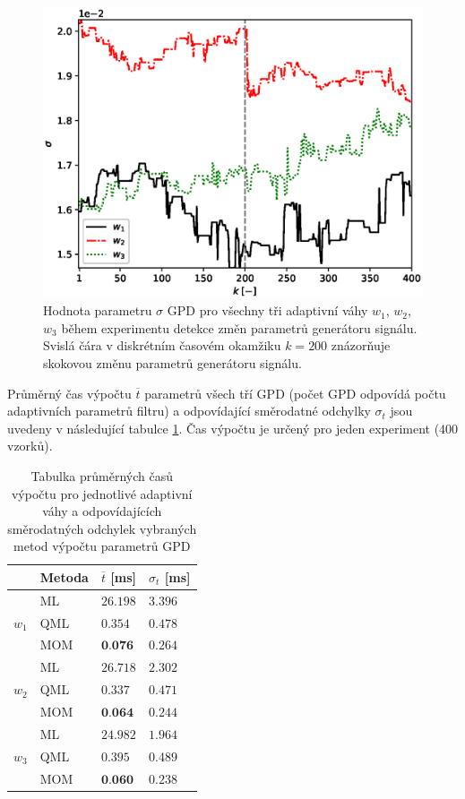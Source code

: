 \begin{figure}[h!]
	\label{fig:par_sigma}
	\centering
	\includegraphics[scale=0.71]{IMG/appel_par/par_sigma.eps}
	\caption{Hodnota parametru $\sigma$ GPD pro všechny tři adaptivní váhy $w_1$, $w_2$, $w_3$ během experimentu detekce změn parametrů generátoru signálu. Svislá čára v diskrétním časovém okamžiku $k=200$ znázorňuje skokovou změnu parametrů generátoru signálu.}
\end{figure}
Průměrný čas výpočtu $\overline{t}$ parametrů všech tří GPD (počet GPD odpovídá počtu adaptivních parametrů filtru) a odpovídající směrodatné odchylky $\sigma_t$ jsou uvedeny v následující tabulce \ref{tab:par_results}. Čas výpočtu je určený pro jeden experiment (400 vzorků).
\begin{table}[h!]

\centering
\caption{Tabulka průměrných časů výpočtu pro jednotlivé adaptivní váhy a odpovídajících směrodatných odchylek vybraných metod výpočtu parametrů GPD}
\begin{tabular}{|l|l||l|l|}
\hline
 & Metoda & $\overline{t}$ {[}ms{]} & $\sigma_t$ {[}ms{]} \\ \hline \hline
\multirow{3}{*}{$w_1$} & ML & $26.198$ & $3.396$ \\ \cline{2-4} 
 & QML & $0.354$ & $0.478$ \\ \cline{2-4} 
 & MOM & $\textbf{0.076}$ & $0.264$ \\ \hline
\multirow{3}{*}{$w_2$} & ML & $26.718$ & $2.302$ \\ \cline{2-4} 
 & QML & $0.337$ & $0.471$ \\ \cline{2-4} 
 & MOM & $\textbf{0.064}$ & $0.244$ \\ \hline
\multirow{3}{*}{$w_3$} & ML & $24.982$ & $1.964$ \\ \cline{2-4} 
 & QML & $0.395$ & $0.489$ \\ \cline{2-4} 
 & MOM & $\textbf{0.060}$ & $0.238$ \\ \hline

\end{tabular}
 \label{tab:par_results}
\end{table}

